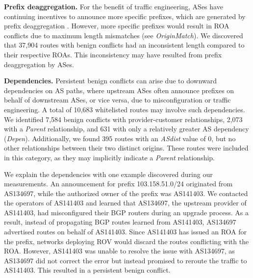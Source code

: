 \noindent\textbf{Prefix deaggregation.} \label{subsubsec:prefix_deagg}
For the benefit of traffic engineering, ASes have continuing incentives to announce more specific prefixes, which are generated by prefix deaggregation \cite{winter2012explicitly, kalogiros2009understanding}. However, more specific prefixes would result in ROA conflicts due to maximum length mismatches (see \textit{OriginMatch}).
We discovered that 37,904 routes with benign conflicts had an inconsistent length compared to their respective ROAs. This inconsistency may have resulted from prefix deaggregation by ASes.

\noindent\textbf{Dependencies.} Persistent benign conflicts can arise due to downward dependencies on AS paths, where upstream ASes often announce prefixes on behalf of downstream ASes, or vice versa, due to misconfiguration or traffic engineering.
A total of 10,683 whitelisted routes may involve such dependencies. We identified 7,584 benign conflicts with provider-customer relationships, 2,073 with a \textit{Parent} relationship, and 631 with only a relatively greater AS dependency (\textit{Depen}). Additionally, we found 395 routes with an \textit{ASdist} value of 0, but no other relationships between their two distinct origins. These routes were included in this category, as they may implicitly indicate a \textit{Parent} relationship.

We explain the dependencies with one example discovered during our measurements. An announcement for prefix 103.158.51.0/24 originated from AS134697, while the authorized owner of the prefix was AS141403. We contacted the operators of AS141403 and learned that AS134697, the upstream provider of AS141403, had misconfigured their BGP routers during an upgrade process. As a result, instead of propagating BGP routes learned from AS141403, AS134697 advertised routes on behalf of AS141403.
Since AS141403 has issued an ROA for the prefix, networks deploying ROV would discard the routes conflicting with the ROA.
However, AS141403 was unable to resolve the issue with AS134697, as AS134697 did not correct the error but instead promised to reroute the traffic to AS141403. This resulted in a persistent benign conflict.


